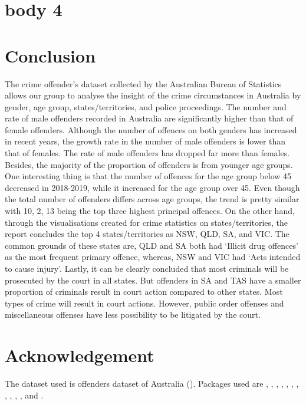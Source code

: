 \documentclass[11pt,a4paper,]{article}
\begin{document}
\pagebreak

\section*{body 4}

\hypertarget{conclusion}{%
\section{Conclusion}\label{conclusion}}

The crime offender's dataset collected by the Australian Bureau of Statistics allows our group to analyse the insight of the crime circumstances in Australia by gender, age group, states/territories, and police proceedings. The number and rate of male offenders recorded in Australia are significantly higher than that of female offenders. Although the number of offences on both genders has increased in recent years, the growth rate in the number of male offenders is lower than that of females. The rate of male offenders has dropped far more than females. Besides, the majority of the proportion of offenders is from younger age groups. One interesting thing is that the number of offences for the age group below 45 decreased in 2018-2019, while it increased for the age group over 45. Even though the total number of offenders differs across age groups, the trend is pretty similar with 10, 2, 13 being the top three highest principal offences. On the other hand, through the visualisations created for crime statistics on states/territories, the report concludes the top 4 states/territories as NSW, QLD, SA, and VIC. The common grounds of these states are, QLD and SA both had `Illicit drug offences' as the most frequent primary offence, whereas, NSW and VIC had `Acts intended to cause injury'. Lastly, it can be clearly concluded that most criminals will be prosecuted by the court in all states. But offenders in SA and TAS have a smaller proportion of criminals result in court action compared to other states. Most types of crime will result in court actions. However, public order offenses and miscellaneous offenses have less possibility to be litigated by the court.

\hypertarget{acknowledgement}{%
\section{Acknowledgement}\label{acknowledgement}}

The dataset used is offenders dataset of Australia (\textcite{ABS}).
Packages used are \textcite{ggplot2}, \textcite{tidyverse}, \textcite{tinytex}, \textcite{float}, \textcite{lubridate}, \textcite{readxl}, \textcite{kable}, \textcite{bookdown}, \textcite{gridExtra}, \textcite{here}, \textcite{dplyr}, and \textcite{readr}.

\newpage

\printbibliography[title=Reference]
\end{document}
